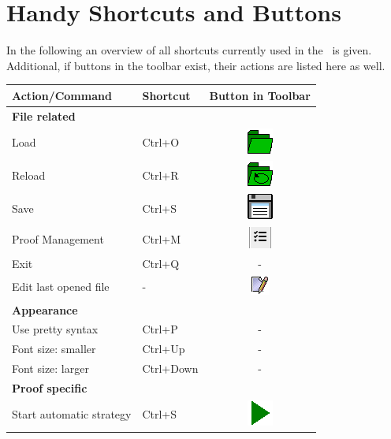 \section{Handy Shortcuts and Buttons}
\label{app:shortcuts}
In the following an overview of all shortcuts currently used 
in the \kp\ is given. Additional, if buttons in the toolbar exist, 
their actions are listed here as well.

\begin{tabular}{llc}
\toprule
Action/Command & Shortcut & Button in Toolbar\\

\midrule
\multicolumn{3}{l}{\textbf{File related}}\\
Load & Ctrl+O & \includegraphics[width=2ex]{../figures/open}\\
Reload & Ctrl+R &\includegraphics[width=2ex]{../figures/openMostRecent}\\
Save & Ctrl+S & \includegraphics[width=2ex]{../figures/saveFile}\\
Proof Management & Ctrl+M & \includegraphics[width=10ex]{../figures/proofManagementButton}\\
Exit &Ctrl+Q& -\\
Edit last opened file & - & \includegraphics[width=2ex]{../figures/editFile}\\
\midrule
\multicolumn{3}{l}{\textbf{Appearance}}\\
Use pretty syntax & Ctrl+P & -\\
Font size: smaller & Ctrl+Up & -\\
Font size: larger& Ctrl+Down & -\\
\midrule
\multicolumn{3}{l}{\textbf{Proof specific}}\\
Start automatic strategy & Ctrl+S & \includegraphics[width=2ex]{../figures/autoModeStart}\\

\end{tabular}
